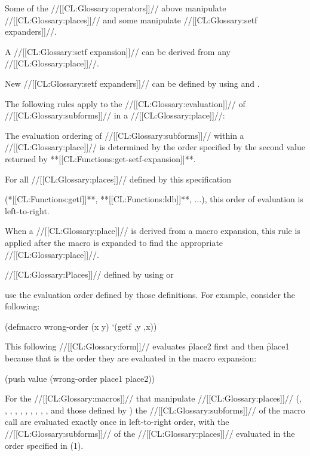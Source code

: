  Some of the //[[CL:Glossary:operators]]// above manipulate //[[CL:Glossary:places]]// and some manipulate //[[CL:Glossary:setf expanders]]//.

A //[[CL:Glossary:setf expansion]]// can be derived from any //[[CL:Glossary:place]]//.

New //[[CL:Glossary:setf expanders]]// can be defined by using   and .

  

The following rules apply to the //[[CL:Glossary:evaluation]]// of //[[CL:Glossary:subforms]]// in a //[[CL:Glossary:place]]//:

\beginlist {} The evaluation ordering of //[[CL:Glossary:subforms]]// within a //[[CL:Glossary:place]]// is determined by the order specified by the second value returned by  **[[CL:Functions:get-setf-expansion]]**. 

For all //[[CL:Glossary:places]]// defined by this specification

(\eg **[[CL:Functions:getf]]**, **[[CL:Functions:ldb]]**, $\ldots$), this order of evaluation is left-to-right. %

When a //[[CL:Glossary:place]]// is derived from a macro expansion, this rule is applied after the macro is expanded to find the appropriate //[[CL:Glossary:place]]//. 

//[[CL:Glossary:Places]]// defined by using  or  

use the evaluation order defined by those definitions. For example, consider the following:

\code
 (defmacro wrong-order (x y) `(getf ,y ,x)) \endcode

This following //[[CL:Glossary:form]]// evaluates \f{place2} first and then \f{place1} because that is the order they are evaluated in the macro expansion:

\code
 (push value (wrong-order place1 place2)) \endcode

  For the //[[CL:Glossary:macros]]// that manipulate //[[CL:Glossary:places]]// 
  (,
   ,
   ,
   ,
   , 
   ,
   ,
   ,
   ,
   , and those defined by ) the //[[CL:Glossary:subforms]]// of the macro call are evaluated exactly once in left-to-right order, with the //[[CL:Glossary:subforms]]// of the //[[CL:Glossary:places]]// evaluated in the order specified in (1).

